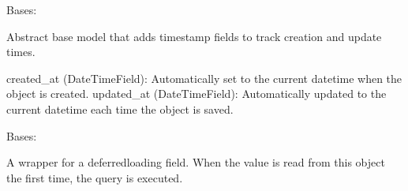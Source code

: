 \documentclass[letterpaper,10pt,english]{sphinxmanual}
\begin{document}
\begin{fulllineitems}
\label{\detokenize{core:core.models.TimeStampeMixin}}
\pysigstartsignatures
\pysiglinewithargsret
{}
{\sphinxparamcomma {}}
{}
\pysigstopsignatures
\sphinxAtStartPar
Bases: 

\sphinxAtStartPar
Abstract base model that adds timestamp fields to track creation and update times.
\begin{description}
\sphinxAtStartPar
created\_at (DateTimeField): Automatically set to the current datetime when the object is created.
updated\_at (DateTimeField): Automatically updated to the current datetime each time the object is saved.

\end{description}

\begin{fulllineitems}
\label{\detokenize{core:core.models.TimeStampeMixin.Meta}}
\pysigstartsignatures
\pysigline
{}
\pysigstopsignatures
\sphinxAtStartPar
Bases: 

\begin{fulllineitems}
\label{\detokenize{core:core.models.TimeStampeMixin.Meta.abstract}}
\pysigstartsignatures
\pysigline
{}
\pysigstopsignatures
\end{fulllineitems}


\end{fulllineitems}


\begin{fulllineitems}
\label{\detokenize{core:core.models.TimeStampeMixin.created_at}}
\pysigstartsignatures
\pysigline
{}
\pysigstopsignatures
\sphinxAtStartPar
A wrapper for a deferred\sphinxhyphen{}loading field. When the value is read from this
object the first time, the query is executed.


\end{fulllineitems}
\end{fulllineitems}
\end{document}
